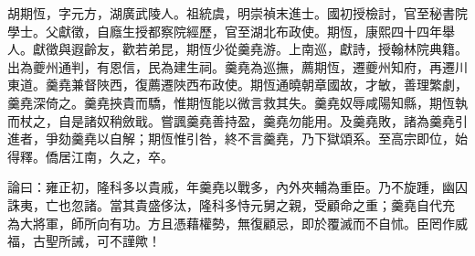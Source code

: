 \begin{pinyinscope}
胡期恆，字元方，湖廣武陵人。祖統虞，明崇禎末進士。國初授檢討，官至秘書院學士。父獻徵，自廕生授都察院經歷，官至湖北布政使。期恆，康熙四十四年舉人。獻徵與遐齡友，歡若弟昆，期恆少從羹堯游。上南巡，獻詩，授翰林院典籍。出為夔州通判，有恩信，民為建生祠。羹堯為巡撫，薦期恆，遷夔州知府，再遷川東道。羹堯兼督陜西，復薦遷陜西布政使。期恆通曉朝章國故，才敏，善理繁劇，羹堯深倚之。羹堯挾貴而驕，惟期恆能以微言救其失。羹堯奴辱咸陽知縣，期恆執而杖之，自是諸奴稍斂戢。嘗諷羹堯善持盈，羹堯勿能用。及羹堯敗，諸為羹堯引進者，爭劾羹堯以自解；期恆惟引咎，終不言羹堯，乃下獄頌系。至高宗即位，始得釋。僑居江南，久之，卒。

論曰：雍正初，隆科多以貴戚，年羹堯以戰多，內外夾輔為重臣。乃不旋踵，幽囚誅夷，亡也忽諸。當其貴盛侈汰，隆科多恃元舅之親，受顧命之重；羹堯自代充為大將軍，師所向有功。方且憑藉權勢，無復顧忌，即於覆滅而不自怵。臣罔作威福，古聖所誡，可不謹歟！


\end{pinyinscope}